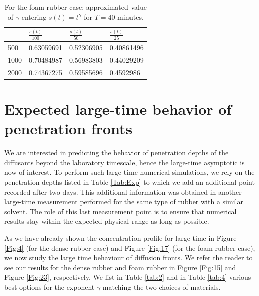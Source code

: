 \documentclass{article}
\begin{document}
	\begin {table}[h]
\begin{center}
	\begin{tabular}{ |p{2.5cm}|p{2cm}|p{2cm}| p{2cm}|}
		\hline
		\diagbox{$a_0$}{$\sigma(s(t))$} & $\frac{s(t)}{100}$&$\frac{s(t)}{50}$& $\frac{s(t)}{25}$\\
		\hline
		500 & 0.63059691 & 0.52306905 &  0.40861496\\
		1000  &0.70484987& 0.56983803 & 0.44029209 \\
		2000  &0.74367275 & 0.59585696  & 0.4592986 \\
		\hline
	\end{tabular}
	\caption {For the foam rubber case: approximated value of  $\gamma$ entering $s(t) = t^\gamma$ for $T = 40$ minutes.}
	\label{tab:3} 
\end{center}
\end {table}
\section{Expected large-time behavior of penetration fronts}\label{discussion}
We are interested in predicting the behavior of penetration depths of the diffusants beyond the laboratory timescale, hence the large-time asymptotic is now of interest. To perform such  large-time numerical simulations, we rely on the penetration depths listed in Table \ref{Tab:Exp} to which we add an additional point recorded after two days. This additional information was obtained in another large-time measurement performed for the same type of rubber with a similar solvent. The role of this last measurement point is to ensure that numerical results stay within the expected physical range as long as possible.

As we have already shown the concentration profile for large time in Figure \ref{Fig:4} (for the  dense rubber case) and Figure \ref{Fig:17} (for the foam rubber case), we now study the large time behaviour of diffusion fronts. We refer the reader to see our results for the dense rubber and foam rubber in Figure \ref{Fig:15} and Figure \ref{Fig:23}, respectively. We list in Table \ref{tab:2} and in Table \ref{tab:4} various best options for the exponent $\gamma$   matching the two choices of materials.
\end{document}
